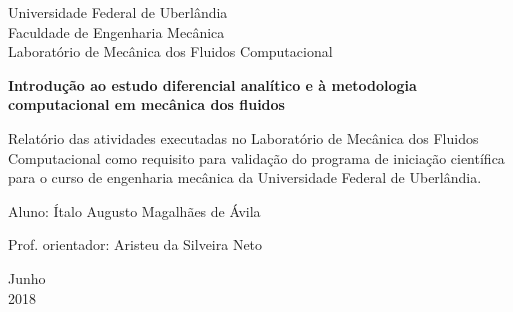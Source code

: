 \begin{titlepage}
	\begin{center}
	

		\Huge{Universidade Federal de Uberlândia}\\
		\large{Faculdade de Engenharia Mecânica}\\ 
		\large{Laboratório de Mecânica dos Fluidos Computacional}\\ 
\vspace{15pt}
        
        \vspace{85pt}
        
		\textbf{\LARGE{Introdução ao estudo diferencial analítico e à metodologia computacional em
mecânica dos fluidos}}
			
	\end{center}
\vspace{1,5cm}
	
	\begin{flushright}

   \begin{list}{}{
      \setlength{\leftmargin}{4.5cm}
      \setlength{\rightmargin}{0cm}
      \setlength{\labelwidth}{0pt}
      \setlength{\labelsep}{\leftmargin}}

      \item Relatório das atividades executadas no Laboratório de Mecânica dos Fluidos Computacional como requisito para validação do programa de iniciação científica para o curso de engenharia mecânica da Universidade Federal de Uberlândia.

      \begin{list}{}{
      \setlength{\leftmargin}{0cm}
      \setlength{\rightmargin}{0cm}
      \setlength{\labelwidth}{0pt}
      \setlength{\labelsep}{\leftmargin}}

			\item Aluno: Ítalo Augusto Magalhães de Ávila \
            \item Prof. orientador: Aristeu da Silveira Neto\

      \end{list}
   \end{list}
\end{flushright}
\vspace{1cm}
\begin{center}
		\vspace{\fill}
		 Junho\\
		 2018
			\end{center}
\end{titlepage}
\newpage
  	   
  	 
  	 \newpage